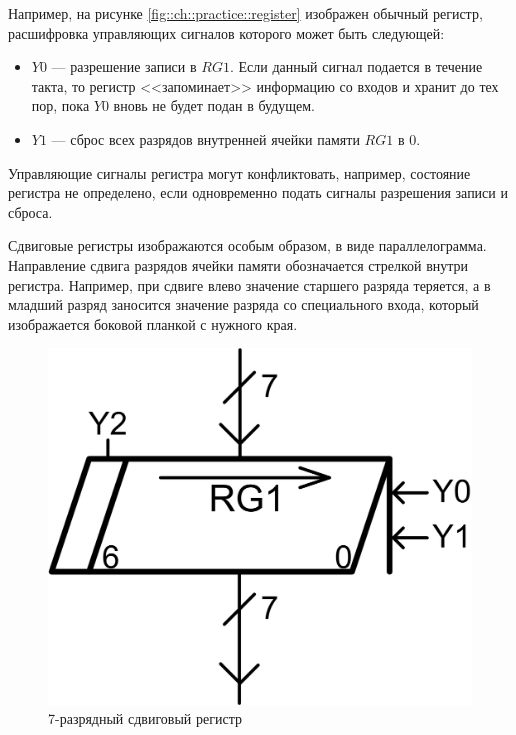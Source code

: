 Например, на рисунке \ref{fig::ch::practice::register} изображен обычный регистр, расшифровка управляющих сигналов которого может быть следующей:
\begin{itemize}
    \item $Y0$ --- разрешение записи в $RG1$. Если данный сигнал подается в течение такта, то регистр <<запоминает>> информацию со входов и хранит до тех пор, пока $Y0$ вновь не будет подан в будущем.

    \item $Y1$ --- сброс всех разрядов внутренней ячейки памяти $RG1$ в $0$.
\end{itemize}

Управляющие сигналы регистра могут конфликтовать, например, состояние регистра не определено, если одновременно подать сигналы разрешения записи и сброса.

Сдвиговые регистры изображаются особым образом, в виде параллелограмма. Направление сдвига разрядов ячейки памяти обозначается стрелкой внутри регистра. Например, при сдвиге влево значение старшего разряда теряется, а в младший разряд заносится значение разряда со специального входа, который изображается боковой планкой с нужного края. 

\begin{figure}[!ht]
    \centering
    \includegraphics{fig/shiftregister}
    \caption{7-разрядный сдвиговый регистр}
    \label{fig::ch::practice::shiftregister}
\end{figure}

